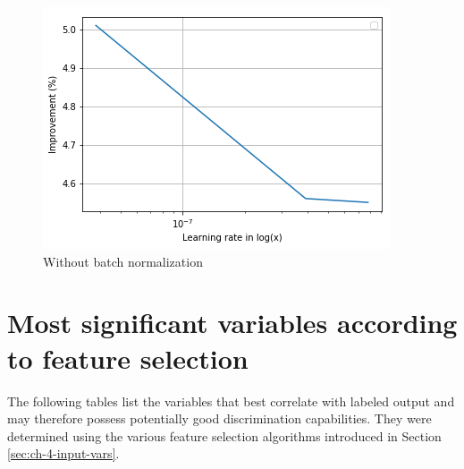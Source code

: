 \begin{figure}[h]
    \centering
    \includegraphics[width=.65\textwidth]{assets/appendix/plot_group5.png}
    \caption{Without batch normalization}
    \label{fig:ch_5_plot5}
\end{figure}

\chapter{Most significant variables according to feature selection}
\label{ch:appendix_c}
The following tables list the variables that best correlate with labeled output and may therefore possess potentially good discrimination capabilities. They were determined using the various feature selection algorithms introduced in Section \ref{sec:ch-4-input-vars}.



